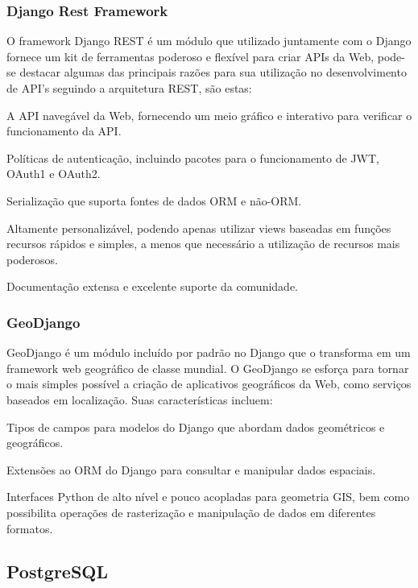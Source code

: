 {{{{{{{\subsubsection{Django Rest Framework}

O framework Django REST é um módulo que utilizado juntamente com o Django fornece um kit de ferramentas poderoso e flexível para criar APIs da Web, pode-se destacar algumas das principais razões para sua utilização no desenvolvimento de API's seguindo a arquitetura REST, são estas:

\begin{lista}
\item A API navegável da Web, fornecendo um meio gráfico e interativo para verificar o funcionamento da API.
\item Políticas de autenticação, incluindo pacotes para o funcionamento de JWT, OAuth1 e OAuth2.
\item Serialização que suporta fontes de dados ORM e não-ORM.
\item Altamente personalizável, podendo apenas utilizar views baseadas em funções recursos rápidos e simples, a menos que necessário a utilização de recursos mais poderosos.
\item Documentação extensa e excelente suporte da comunidade.
\end{lista}

\subsubsection{GeoDjango}

GeoDjango é um módulo incluído por padrão no Django que o transforma em um framework web geográfico de classe mundial. O GeoDjango se esforça para tornar o mais simples possível a criação de aplicativos geográficos da Web, como serviços baseados em localização. Suas características incluem:

\begin{lista}
\item Tipos de campos para modelos do Django que abordam dados geométricos e geográficos.
\item Extensões ao ORM do Django para consultar e manipular dados espaciais.
\item Interfaces Python de alto nível e pouco acopladas para geometria GIS, bem como possibilita operações de rasterização e manipulação de dados em diferentes formatos.
\end{lista}

\subsection{PostgreSQL}

}}}}}}}
